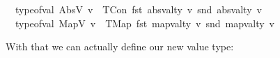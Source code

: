 \begin{isabellebody}
\ {\isacharbar}{\kern0pt}\ {\isachardoublequoteopen}type{\isacharunderscore}{\kern0pt}of{\isacharunderscore}{\kern0pt}val\ {\isacharparenleft}{\kern0pt}AbsV\ v{\isacharparenright}{\kern0pt}\ {\isacharequal}{\kern0pt}\ TCon\ {\isacharparenleft}{\kern0pt}fst\ {\isacharparenleft}{\kern0pt}absval{\isacharunderscore}{\kern0pt}ty\ v{\isacharparenright}{\kern0pt}{\isacharparenright}{\kern0pt}\ {\isacharparenleft}{\kern0pt}snd\ {\isacharparenleft}{\kern0pt}absval{\isacharunderscore}{\kern0pt}ty\ v{\isacharparenright}{\kern0pt}{\isacharparenright}{\kern0pt}{\isachardoublequoteclose}\isanewline
\ {\isacharbar}{\kern0pt}\ {\isachardoublequoteopen}type{\isacharunderscore}{\kern0pt}of{\isacharunderscore}{\kern0pt}val\ {\isacharparenleft}{\kern0pt}MapV\ v{\isacharparenright}{\kern0pt}\ {\isacharequal}{\kern0pt}\ TMap\ {\isacharparenleft}{\kern0pt}fst\ {\isacharparenleft}{\kern0pt}mapval{\isacharunderscore}{\kern0pt}ty\ v{\isacharparenright}{\kern0pt}{\isacharparenright}{\kern0pt}\ {\isacharparenleft}{\kern0pt}snd\ {\isacharparenleft}{\kern0pt}mapval{\isacharunderscore}{\kern0pt}ty\ v{\isacharparenright}{\kern0pt}{\isacharparenright}{\kern0pt}{\isachardoublequoteclose}\isanewline
\end{isabellebody}


With that we can actually define our new value type:



